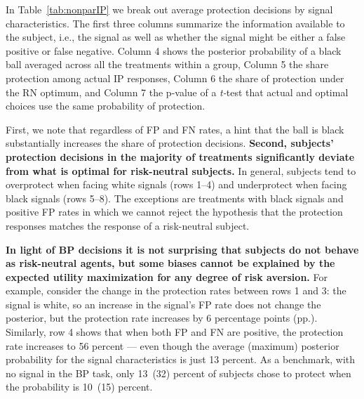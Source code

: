 \documentclass[12pt,a4paper]{article}
\newcommand{\pmt}[1]{{\color{Blue}#1}}
\begin{document}

In Table~\ref{tab:nonparIP} we break out average protection decisions by signal characteristics. The first three columns summarize the information available to the subject, i.e., the signal as well as whether the signal might be either a false positive or false negative. Column 4 shows the posterior probability of a black ball averaged across all the treatments within a group, Column 5 the share protection among actual IP responses, Column 6 the share of protection under the RN optimum, and Column 7 the p-value of a \emph{t-}test that actual and optimal choices use the same probability of protection.

First, we note that regardless of FP and FN rates, a hint that the ball is black substantially increases the share of protection decisions.  \textbf{Second, subjects' protection decisions in the majority of treatments significantly deviate from what is optimal for risk-neutral subjects.}  In general, subjects tend to overprotect when facing white signals (rows 1--4) and underprotect when facing black signals (rows 5--8). The exceptions are treatments with black signals and positive FP rates in which we cannot reject the hypothesis that the protection responses matches the response of a risk-neutral subject. 

\textbf{In light of BP decisions it is not surprising that subjects do not behave as risk-neutral agents, but some biases cannot be explained by the expected utility maximization for any degree of risk aversion.} For example, consider the change in the protection rates between rows 1 and 3: the signal is white, so an increase in the signal's FP rate does not change the posterior, but the protection rate increases by 6 percentage points (pp.). Similarly, row 4 shows that when both FP and FN are positive, the protection rate increases to 56 percent --- even though the average (maximum) posterior probability for the signal characteristics is just 13 percent. As a benchmark, with no signal in the BP task, only 13~(32) percent of subjects chose to protect when the probability is 10~(15) percent. 

\end{document}
